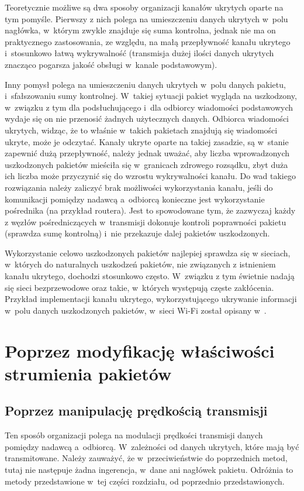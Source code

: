 \documentclass[a4paper, twoside, 12pt]{report}
\begin{document}
        Teoretycznie możliwe są dwa
        sposoby organizacji kanałów ukrytych oparte na tym pomyśle. Pierwszy z nich polega na umieszczeniu
        danych ukrytych w~polu nagłówka, w~którym zwykle znajduje się suma kontrolna,
        jednak nie ma on praktycznego zastosowania, ze względu, na małą przepływność
        kanału ukrytego i~stosunkowo łatwą wykrywalność (transmisja dużej ilości
        danych ukrytych znacząco pogarsza jakość obsługi w~kanale podstawowym).

        Inny pomysł polega
        na umieszczeniu danych ukrytych w~polu danych pakietu, i~sfałszowaniu sumy
        kontrolnej. W~takiej sytuacji pakiet wygląda na uszkodzony, w~związku z tym
        dla podsłuchującego i~dla odbiorcy wiadomości podstawowych wydaje się
        on nie przenosić żadnych użytecznych danych. Odbiorca wiadomości ukrytych,
        widząc, że to właśnie w~takich pakietach znajdują się wiadomości ukryte,
        może je odczytać. Kanały ukryte oparte na takiej zasadzie, są w~stanie
        zapewnić dużą przepływność, należy jednak uważać, aby liczba wprowadzonych
        uszkodzonych pakietów mieściła się w~granicach zdrowego rozsądku, zbyt duża
        ich liczba może przyczynić się do wzrostu wykrywalności kanału. Do wad takiego
        rozwiązania należy zaliczyć brak możliwości wykorzystania kanału, jeśli do
        komunikacji pomiędzy nadawcą a~odbiorcą konieczne jest wykorzystanie pośrednika (na przykład routera).
        Jest to spowodowane tym, że zazwyczaj każdy z węzłów pośredniczących w~transmisji
        dokonuje kontroli poprawności pakietu (sprawdza sumę kontrolną) i~nie przekazuje
        dalej pakietów uszkodzonych.

        Wykorzystanie celowo uszkodzonych pakietów najlepiej sprawdza się w
        sieciach, w~których do naturalnych uszkodzeń pakietów, nie związanych z
        istnieniem kanału ukrytego, dochodzi stosunkowo często. W~związku z tym
        świetnie nadają się sieci bezprzewodowe oraz takie, w~których występują
        częste zakłócenia. Przykład implementacji kanału ukrytego, wykorzystującego
        ukrywanie informacji w~polu danych uszkodzonych pakietów, w~sieci Wi-Fi
        został opisany w~\cite{HICCUPS}.

    \section{Poprzez modyfikację właściwości strumienia pakietów} \label{MODYFIKACJASTRUMIENIA}
        \subsection{Poprzez manipulację prędkością transmisji}
        Ten sposób organizacji polega na modulacji prędkości transmisji danych
        pomiędzy nadawcą a~odbiorcą. W~zależności od danych ukrytych, które mają
        być transmitowane. Należy zauważyć, że w~przeciwieństwie do poprzednich
        metod, tutaj nie następuje żadna ingerencja, w~dane ani nagłówek pakietu.
        Odróżnia to metody przedstawione w~tej części rozdziału, od poprzednio
        przedstawionych.
\end{document}
